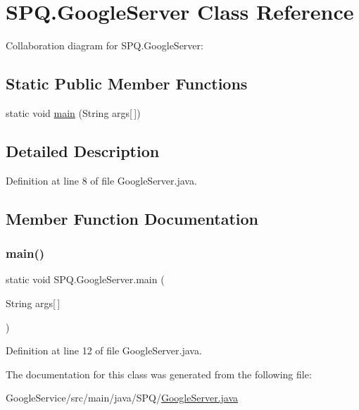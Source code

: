 \hypertarget{class_s_p_q_1_1_google_server}{}\section{S\+P\+Q.\+Google\+Server Class Reference}
\label{class_s_p_q_1_1_google_server}


Collaboration diagram for S\+P\+Q.\+Google\+Server\+:
\subsection*{Static Public Member Functions}
\begin{DoxyCompactItemize}
\item 
static void \mbox{\hyperlink{class_s_p_q_1_1_google_server_a274b82865fbf2ccda7ddafe6ae442b15}{main}} (String args\mbox{[}$\,$\mbox{]})
\end{DoxyCompactItemize}


\subsection{Detailed Description}


Definition at line 8 of file Google\+Server.\+java.



\subsection{Member Function Documentation}
\mbox{\label{class_s_p_q_1_1_google_server_a274b82865fbf2ccda7ddafe6ae442b15}} 
\subsubsection{\texorpdfstring{main()}{main()}}
{\footnotesize\ttfamily static void S\+P\+Q.\+Google\+Server.\+main (\begin{DoxyParamCaption}\item[{String}]{args\mbox{[}$\,$\mbox{]} }\end{DoxyParamCaption})\hspace{0.3cm}{\ttfamily [static]}}



Definition at line 12 of file Google\+Server.\+java.



The documentation for this class was generated from the following file\+:\begin{DoxyCompactItemize}
\item 
Google\+Service/src/main/java/\+S\+P\+Q/\mbox{\hyperlink{_google_server_8java}{Google\+Server.\+java}}\end{DoxyCompactItemize}
